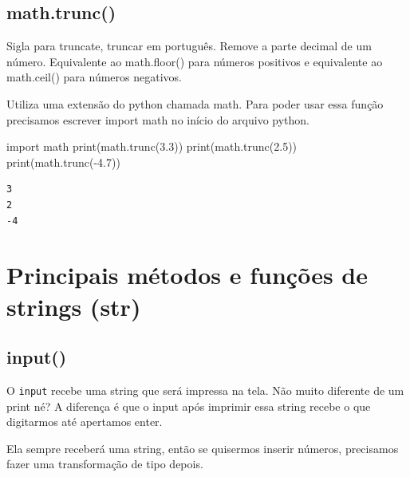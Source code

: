 \documentclass[
  letterpaper,
  DIV=11,
  numbers=noendperiod]{scrreprt}
\newenvironment{Shaded}{\begin{snugshade}}{\end{snugshade}}
\newcommand{\BuiltInTok}[1]{\textcolor[rgb]{0.00,0.23,0.31}{#1}}
\newcommand{\FloatTok}[1]{\textcolor[rgb]{0.68,0.00,0.00}{#1}}
\newcommand{\ImportTok}[1]{\textcolor[rgb]{0.00,0.46,0.62}{#1}}
\newcommand{\NormalTok}[1]{\textcolor[rgb]{0.00,0.23,0.31}{#1}}
\newcommand{\OperatorTok}[1]{\textcolor[rgb]{0.37,0.37,0.37}{#1}}
\begin{document}
\hypertarget{math.trunc}{%
\subsection{math.trunc()}\label{math.trunc}}

Sigla para truncate, truncar em português. Remove a parte decimal de um
número. Equivalente ao math.floor() para números positivos e equivalente
ao math.ceil() para números negativos.

Utiliza uma extensão do python chamada math. Para poder usar essa função
precisamos escrever import math no início do arquivo python.

\begin{Shaded}
\begin{Highlighting}[]
\ImportTok{import}\NormalTok{ math}
\BuiltInTok{print}\NormalTok{(math.trunc(}\FloatTok{3.3}\NormalTok{))}
\BuiltInTok{print}\NormalTok{(math.trunc(}\FloatTok{2.5}\NormalTok{))}
\BuiltInTok{print}\NormalTok{(math.trunc(}\OperatorTok{{-}}\FloatTok{4.7}\NormalTok{))}
\end{Highlighting}
\end{Shaded}

\begin{tcolorbox}[enhanced jigsaw, breakable, leftrule=.75mm, left=2mm, opacityback=0, bottomrule=.15mm, toprule=.15mm, rightrule=.15mm, arc=.35mm, colback=white]

\begin{verbatim}
3
2
-4
\end{verbatim}

\end{tcolorbox}

\hypertarget{principais-muxe9todos-e-funuxe7uxf5es-de-strings-str}{%
\section{Principais métodos e funções de strings
(str)}\label{principais-muxe9todos-e-funuxe7uxf5es-de-strings-str}}

\hypertarget{input}{%
\subsection{input()}\label{input}}

O \texttt{input} recebe uma string que será impressa na tela. Não muito
diferente de um print né? A diferença é que o input após imprimir essa
string recebe o que digitarmos até apertamos enter.

Ela sempre receberá uma string, então se quisermos inserir números,
precisamos fazer uma transformação de tipo depois.
\end{document}
